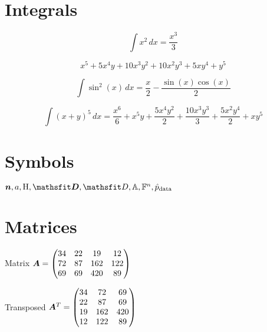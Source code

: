 \documentclass[12pt]{article}
\begin{document}
    \section{Integrals}\label{sec:integrals}

    \begin{equation}
        \int x^{2}\, dx = \frac{x^{3}}{3}
    \end{equation}

    \begin{equation}
        x^{5} + 5 x^{4} y + 10 x^{3} y^{2} + 10 x^{2} y^{3} + 5 x y^{4} + y^{5}
    \end{equation}

    \begin{equation}
        \int \sin^{2}{\left(x \right)}\, dx = \frac{x}{2} - \frac{\sin{\left(x \right)} \cos{\left(x \right)}}{2}
    \end{equation}

    \begin{equation}
        \int \left(x + y\right)^{5}\, dx = \frac{x^{6}}{6} + x^{5} y + \frac{5 x^{4} y^{2}}{2} + \frac{10 x^{3} y^{3}}{3} + \frac{5 x^{2} y^{4}}{2} + x y^{5}
    \end{equation}


    \section{Symbols}\label{sec:symbols}
    \begin{math}
        \vn, \eva, \ermH, \tD, \etD, \sA, \sF^{n}, \ptrain
    \end{math}


    \section{Matrices}\label{sec:matrices}

    Matrix
    \begin{math}
        {\bm{A}} = \left(\begin{matrix}
                        34 & 22 & 19 & 12\\72 & 87 & 162 & 122\\69 & 69 & 420 & 89
        \end{matrix}\right)
    \end{math}

    Transposed
    \begin{math}
        {\bm{A}}^{T} = \left(\begin{matrix}
                            34 & 72 & 69\\22 & 87 & 69\\19 & 162 & 420\\12 & 122 & 89
        \end{matrix}\right)
    \end{math}
\end{document}

